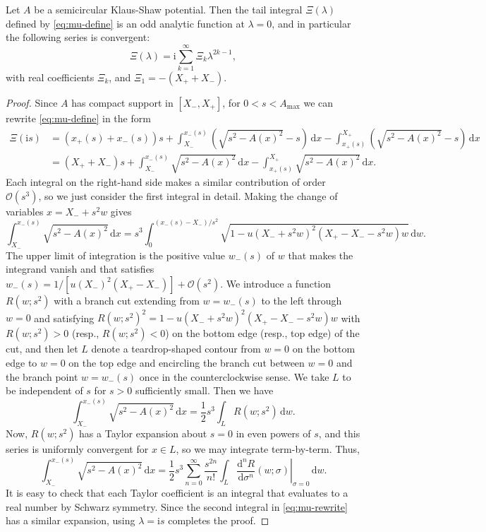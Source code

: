 \documentclass[12pt]{amsart}
\numberwithin{equation}{section}
\newcommand{\dd}{\mathrm{d}}
\newcommand{\ii}{\mathrm{i}}
\newcommand{\tailint}{\Xi}
\newcommand{\bigo}[1]{ \mathcal{O}\! \left( #1 \right) }
\begin{document}
\begin{prop}
Let $A$ be a semicircular Klaus-Shaw potential.  Then the tail integral $\tailint(\lambda)$ defined by \eqref{eq:mu-define} is an odd analytic function at $\lambda=0$, and in particular the following series is convergent:
\begin{equation}
\tailint(\lambda)=\ii\sum_{k=1}^\infty\tailint_k\lambda^{2k-1},
\end{equation}
with real coefficients $\tailint_k$, and $\tailint_1=-(X_++X_-)$.
\label{prop:mu-odd-analytic}
\end{prop}
\begin{proof}
Since $A$ has compact support in $[X_-,X_+]$, for $0<s<A_\mathrm{max}$ we can rewrite \eqref{eq:mu-define} in the form
\begin{align}
\tailint(\ii s)&=(x_+(s)+x_-(s))s + \int_{X_-}^{x_-(s)}\left(\sqrt{s^2-A(x)^2}-s\right)\,\dd x -\int_{x_+(s)}^{X_+}\left(\sqrt{s^2-A(x)^2}-s\right)\,\dd x\nonumber \\
&=(X_++X_-)s + \int_{X_-}^{x_-(s)}\sqrt{s^2-A(x)^2}\,\dd x -\int_{x_+(s)}^{X_+}\sqrt{s^2-A(x)^2}\,\dd x.
\label{eq:mu-rewrite}
\end{align}
Each integral on the right-hand side makes a similar contribution of order $\bigo{s^3}$, so we just consider the first integral in detail.  Making the change of variables $x=X_-+s^2w$ gives
\begin{equation}
\int_{X_-}^{x_-(s)}\sqrt{s^2-A(x)^2}\,\dd x = s^3\int_0^{(x_-(s)-X_-)/s^2}\sqrt{1-u(X_-+s^2w)^2(X_+-X_--s^2w)w}\,\dd w.
\end{equation}
The upper limit of integration is the positive value $w_-(s)$ of $w$ that makes the integrand vanish and that satisfies $w_-(s)=1/[u(X_-)^2(X_+-X_-)] + \bigo{s^2}$.  We introduce a function $R(w;s^2)$ with a branch cut extending from $w=w_-(s)$ to the left through $w=0$ and satisfying $R(w;s^2)^2=1-u(X_-+s^2w)^2(X_+-X_--s^2w)w$ with $R(w;s^2)>0$ (resp., $R(w;s^2)<0$) on the bottom edge (resp., top edge) of the cut, and then let $L$ denote a teardrop-shaped contour from $w=0$ on the bottom edge to $w=0$ on the top edge and encircling the branch cut between $w=0$ and the branch point $w=w_-(s)$  once in the counterclockwise sense.  We take $L$ to be independent of $s$ for $s>0$ sufficiently small.  Then we have
\begin{equation}
\int_{X_-}^{x_-(s)}\sqrt{s^2-A(x)^2}\,\dd x = \frac{1}{2}s^3\int_L R(w;s^2)\,\dd w.
\end{equation}
Now, $R(w;s^2)$ has a Taylor expansion about $s=0$ in even powers of $s$, and this series is uniformly convergent for $x\in L$, so we may integrate term-by-term.   Thus,
\begin{equation}
\int_{X_-}^{x_-(s)}\sqrt{s^2-A(x)^2}\,\dd x = \frac{1}{2}s^3\sum_{n=0}^\infty\frac{s^{2n}}{n!}\int_L\left.\frac{\dd^nR}{\dd\sigma^n}(w;\sigma)\right|_{\sigma=0}\,\dd w.
\end{equation}
It is easy to check that each Taylor coefficient is an integral that evaluates to a real number by Schwarz symmetry.  Since the second integral in \eqref{eq:mu-rewrite} has a similar expansion, using $\lambda=\ii s$ completes the proof.
\end{proof}
\end{document}
